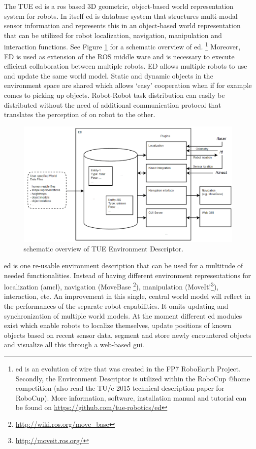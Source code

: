 The TUE \acrfull{ed} is a \acrfull{ros} based 3D geometric, object-based world representation system for robots. In itself \acrshort{ed} is database system that structures multi-modal sensor information and represents this in an object-based world representation that can be utilized for robot localization, navigation, manipulation and interaction functions. See Figure \ref{fig:ed} for a schematic overview of \acrshort{ed}. \footnote{\acrshort{ed} is an evolution of \acrfull{wire} that was created in the FP7 RoboEarth Project. Secondly, the Environment Descriptor is utilized within the RoboCup @home competition (also read the TU/e 2015 technical description paper for RoboCup). More information,  software, installation manual and tutorial can be found on \url{https://github.com/tue-robotics/ed}}
Moreover, ED is used as extension of the ROS middle ware and is necessary to execute efficient collaboration between multiple robots.  ED allows multiple robots to use and update the same world model. Static and dynamic objects in the environment space are shared which allows ‘easy’ cooperation when if for example comes to picking up objects. Robot-Robot task distribution can easily be distributed without the need of additional communication protocol that translates the perception of on robot to the other. 
\begin{figure}[ht]
	\includegraphics[width = \linewidth]{Figures/ed_overview}
	\caption{schematic overview of TUE Environment Descriptor.}
	\label{fig:ed}
\end{figure}
\acrshort{ed} is one re-usable environment description that can be used for a multitude of needed functionalities. Instead of having different environment representations for localization (\acrfull{amcl}), navigation (MoveBase \footnote{\url{http://wiki.ros.org/move_base}}), manipulation (MoveIt!\footnote{\url{http://moveit.ros.org/}}), interaction, etc. An improvement in this single, central world model will reflect in the performances of the separate robot capabilities. It omits updating and synchronization of multiple world models. At the moment different \acrshort{ed} modules exist which enable robots to localize themselves, update positions of known objects based on recent sensor data, segment and store newly encountered objects and visualize all this through a web-based \acrshort{gui}. 
